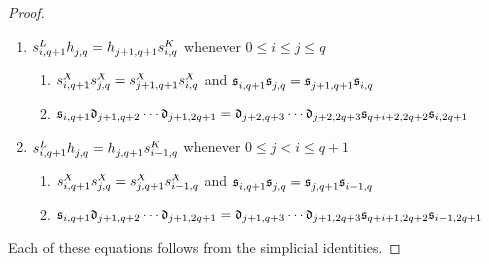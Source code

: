\documentclass[11pt]{amsart}
\theoremstyle{plain}
\begin{document}
\begin{proof}
{\begin{enumerate}
\begin{enumerate}
$\frakd_{i,q+1}\circ
\frakd_{j+1,q+2}\circ\cdots \circ\frakd_{j+1,2q+1}=
\frakd_{j+1,q+1}\circ\cdots \circ\frakd_{j+1,2q-1}\circ
\frakd_{q+i-1,2q}\circ\frakd_{i-1,2q+1}$
\end{enumerate}
\item ${s}_{\smash{i,q+1}}^{\smash{L}}\relax {h}_{\smash{j,q}}^{\smash{}}={h}_{\smash{j+1,q+1}}^{\smash{}}\relax {s}_{\smash{i,q}}^{\smash{K}}$ whenever $0\leq i\leq j\leq q$
\begin{enumerate}\squishlist
\setlength{\parindent}{.25in}
\item ${s}_{\smash{i,q+1}}^{\smash{X}}\relax {s}_{\smash{j,q}}^{\smash{X}}={s}_{\smash{j+1,q+1}}^{\smash{X}}\relax {s}_{\smash{i,q}}^{\smash{X}}$ and ${\mathfrak{s}}_{\smash{i,q+1}}^{\smash{}}\relax {\mathfrak{s}}_{\smash{j,q}}^{\smash{}}={\mathfrak{s}}_{\smash{j+1,q+1}}^{\smash{}}\relax {\mathfrak{s}}_{\smash{i,q}}^{\smash{}}$
\item 
$\mathfrak{s}_{i,q+1}\relax
\mathfrak{d}_{j+1,q+2}\relax\cdots \relax\mathfrak{d}_{j+1,2q+1}=
\mathfrak{d}_{j+2,q+3}\relax\cdots \relax\mathfrak{d}_{j+2,2q+3}\relax
\mathfrak{s}_{q+i+2,2q+2}\relax\mathfrak{s}_{i,2q+1}$
\end{enumerate}
\item ${s}_{\smash{i,q+1}}^{\smash{L}}\relax {h}_{\smash{j,q}}^{\smash{}}={h}_{\smash{j,q+1}}^{\smash{}}\relax {s}_{\smash{i-1,q}}^{\smash{K}}$ whenever $0\leq j<i\leq q+1$
\begin{enumerate}\squishlist
\setlength{\parindent}{.25in}
\item ${s}_{\smash{i,q+1}}^{\smash{X}}\relax {s}_{\smash{j,q}}^{\smash{X}}={s}_{\smash{j,q+1}}^{\smash{X}}\relax {s}_{\smash{i-1,q}}^{\smash{X}}$ and ${\mathfrak{s}}_{\smash{i,q+1}}^{\smash{}}\relax {\mathfrak{s}}_{\smash{j,q}}^{\smash{}}={\mathfrak{s}}_{\smash{j,q+1}}^{\smash{}}\relax {\mathfrak{s}}_{\smash{i-1,q}}^{\smash{}}$
\item 
$\mathfrak{s}_{i,q+1}\relax
\mathfrak{d}_{j+1,q+2}\relax\cdots \relax\mathfrak{d}_{j+1,2q+1}=
\mathfrak{d}_{j+1,q+3}\relax\cdots \relax\mathfrak{d}_{j+1,2q+3}\relax
\mathfrak{s}_{q+i+1,2q+2}\relax\mathfrak{s}_{i-1,2q+1}$
\end{enumerate}
\end{enumerate}
}
\noindent Each of these equations follows from the simplicial identities.
\end{proof}



\printbibliography
\end{document}
